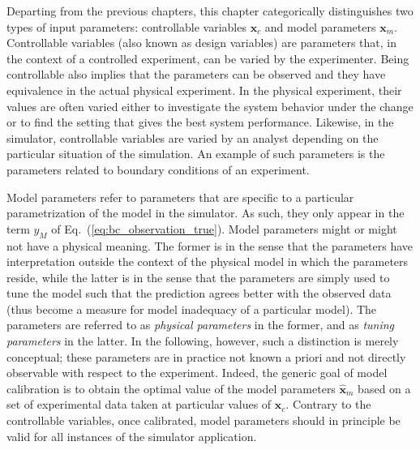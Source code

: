 Departing from the previous chapters, this chapter categorically distinguishes two types of input parameters: controllable variables $\bm{x}_c$ and model parameters $\bm{x}_m$.
Controllable variables (also known as design variables) are parameters that, in the context of a controlled experiment, can be varied by the experimenter.
Being controllable also implies that the parameters can be observed and they have equivalence in the actual physical experiment.
In the physical experiment, their values are often varied either to investigate the system behavior under the change or to find the setting that gives the best system performance.
Likewise, in the simulator, controllable variables are varied by an analyst depending on the particular situation of the simulation.
An example of such parameters is the parameters related to boundary conditions of an experiment.

Model parameters refer to parameters that are specific to a particular parametrization of the model in the simulator.
As such, they only appear in the term $y_M$ of Eq.~(\ref{eq:bc_observation_true}).
Model parameters might or might not have a physical meaning.
The former is in the sense that the parameters have interpretation outside the context of the physical model in which the parameters reside, while the latter is in the sense that the parameters are simply used to tune the model such that the prediction agrees better with the observed data (thus become a measure for model inadequacy of a particular model).
The parameters are referred to as \emph{physical parameters} in the former,
and as \emph{tuning parameters} in the latter.
In the following, however, such a distinction is merely conceptual;
these parameters are in practice not known a priori and not directly observable with respect to the experiment.
Indeed, the generic goal of model calibration is to obtain the optimal value of the model parameters $\hat{\bm{x}}_m$ based on a set of experimental data taken at particular values of $\bm{x}_c$.
Contrary to the controllable variables, once calibrated, model parameters should in principle be valid for all instances of the simulator application.

